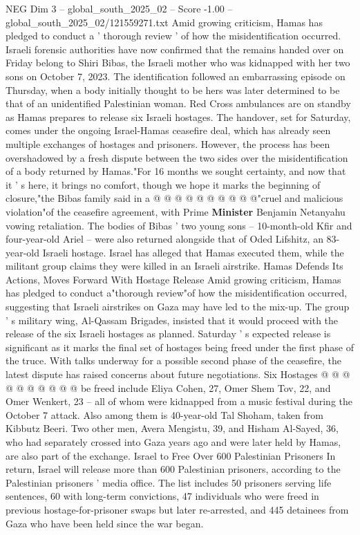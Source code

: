 \begin{textsample}{NEG Dim 3 – global\_south\_2025\_02 – Score -1.00 – global\_south\_2025\_02/121559271.txt}  \label{ex:f3_neg_003}
Amid growing criticism, Hamas has pledged to conduct a ' thorough review ' of how the misidentification occurred.
Israeli forensic authorities have now confirmed that the remains handed over on Friday belong to Shiri Bibas, the Israeli mother who was kidnapped with her two sons on October 7, 2023.
The identification followed an embarrassing episode on Thursday, when a body initially thought to be hers was later determined to be that of an unidentified Palestinian woman.
Red Cross ambulances are on standby as Hamas prepares to release six Israeli hostages.
The handover, set for Saturday, comes under the ongoing Israel-Hamas ceasefire deal, which has already seen multiple exchanges of hostages and prisoners.
However, the process has been overshadowed by a fresh dispute between the two sides over the misidentification of a body returned by Hamas."For 16 months we sought certainty, and now that it ' s here, it brings no comfort, though we hope it marks the beginning of closure,"the Bibas family said in a @ @ @ @ @ @ @ @ @ @"cruel and malicious violation"of the ceasefire agreement, with Prime \textbf{Minister} Benjamin Netanyahu vowing retaliation.
The bodies of Bibas ' two young sons -- 10-month-old Kfir and four-year-old Ariel -- were also returned alongside that of Oded Lifshitz, an 83-year-old Israeli hostage.
Israel has alleged that Hamas executed them, while the militant group claims they were killed in an Israeli airstrike.
Hamas Defends Its Actions, Moves Forward With Hostage Release Amid growing criticism, Hamas has pledged to conduct a"thorough review"of how the misidentification occurred, suggesting that Israeli airstrikes on Gaza may have led to the mix-up.
The group ' s military wing, Al-Qassam Brigades, insisted that it would proceed with the release of the six Israeli hostages as planned.
Saturday ' s expected release is significant as it marks the final set of hostages being freed under the first phase of the truce.
With talks underway for a possible second phase of the ceasefire, the latest dispute has raised concerns about future negotiations.
Six Hostages @ @ @ @ @ @ @ @ @ @ be freed include Eliya Cohen, 27, Omer Shem Tov, 22, and Omer Wenkert, 23 -- all of whom were kidnapped from a music festival during the October 7 attack.
Also among them is 40-year-old Tal Shoham, taken from Kibbutz Beeri.
Two other men, Avera Mengistu, 39, and Hisham Al-Sayed, 36, who had separately crossed into Gaza years ago and were later held by Hamas, are also part of the exchange.
Israel to Free Over 600 Palestinian Prisoners In return, Israel will release more than 600 Palestinian prisoners, according to the Palestinian prisoners ' media office.
The list includes 50 prisoners serving life sentences, 60 with long-term convictions, 47 individuals who were freed in previous hostage-for-prisoner swaps but later re-arrested, and 445 detainees from Gaza who have been held since the war began.

\end{textsample}
